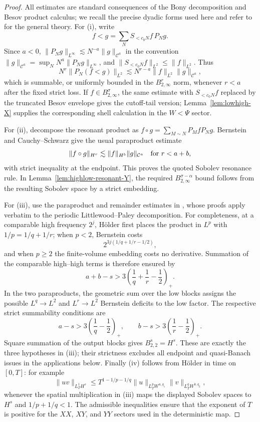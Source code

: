 \documentclass[10pt]{amsart}
\numberwithin{equation}{section}
\theoremstyle{plain}
\theoremstyle{definition}
\theoremstyle{remark}
\newcommand{\C}{\mathcal{C}}
\begin{document}
\begin{proof}
All estimates are standard consequences of the Bony decomposition and Besov product calculus; we recall the precise dyadic forms used here and refer to \cite{BCD} for the general theory.  For (i), write
\[
        f<g=\sum_N S_{<c_0N}f\,P_Ng.
\]
Since $a<0$, $\|P_Ng\|_{L^\infty}\lesssim N^{-a}\|g\|_{\C^a}$ in the convention $\|g\|_{\C^a}=\sup_N N^a\|P_Ng\|_{L^\infty}$, and $\|S_{<c_0N}f\|_{L^2}\le \|f\|_{L^2}$.  Thus
\[
        N^r\|P_N(f<g)\|_{L^2}
        \lesssim N^{r-a}\|f\|_{L^2}\|g\|_{\C^a},
\]
which is summable, or uniformly bounded in the $B_{2,\infty}^r$ norm, whenever $r<a$ after the fixed strict loss.  If $f\in B_{2,\infty}^\sigma$, the same estimate with $S_{<c_0N}f$ replaced by the truncated Besov envelope gives the cutoff-tail version; Lemma~\ref{lem:lowhigh-X} supplies the corresponding shell calculation in the $W<\Psi$ sector.

For (ii), decompose the resonant product as $f\circ g=\sum_{M\sim N}P_MfP_Ng$.  Bernstein and Cauchy--Schwarz give the usual paraproduct estimate
\[
        \|f\circ g\|_{H^r}\lesssim \|f\|_{H^b}\|g\|_{\C^a}
        \quad\hbox{for } r<a+b,
\]
with strict inequality at the endpoint.  This proves the quoted Sobolev resonance rule.  In Lemma~\ref{lem:highlow-resonant-Y}, the required $B_{2,\infty}^{\sigma-\alpha}$ bound follows from the resulting Sobolev space by a strict embedding.

For (iii), use the paraproduct and remainder estimates in \cite[Theorems~2.82 and~2.85]{BCD}, whose proofs apply verbatim to the periodic Littlewood--Paley decomposition.  For completeness, at a comparable high frequency $2^j$, H\"older first places the product in $L^p$ with $1/p=1/q+1/r$; when $p<2$, Bernstein costs
\[
        2^{3j(1/q+1/r-1/2)},
\]
and when $p\ge2$ the finite-volume embedding costs no derivative.  Summation of the comparable high--high terms is therefore ensured by
\[
        a+b-s>3\left(\frac1q+\frac1r-\frac12\right)_+.
\]
In the two paraproducts, the geometric sum over the low blocks assigns the possible $L^q\to L^2$ and $L^r\to L^2$ Bernstein deficits to the low factor.  The respective strict summability conditions are
\[
        a-s>3\left(\frac1q-\frac12\right)_+,
        \qquad
        b-s>3\left(\frac1r-\frac12\right)_+.
\]
Square summation of the output blocks gives $B_{2,2}^s=H^s$.  These are exactly the three hypotheses in (iii); their strictness excludes all endpoint and quasi-Banach issues in the applications below.  Finally (iv) follows from H\"older in time on $[0,T]$: for example
\[
        \|uv\|_{L_T^1H^s}\le T^{1-1/p-1/q}\|u\|_{L_T^pW^{a,q_1}}
        \|v\|_{L_T^qW^{b,q_2}},
\]
whenever the spatial multiplication in (iii) maps the displayed Sobolev spaces to $H^s$ and $1/p+1/q<1$.  The admissible inequalities ensure that the exponent of $T$ is positive for the $XX$, $XY$, and $YY$ sectors used in the deterministic map.
\end{proof}
\end{document}
